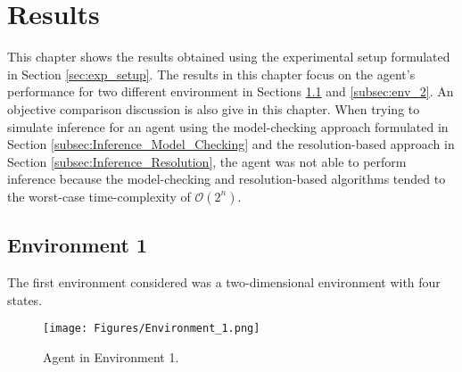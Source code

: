 





\chapter{Results} 
\label{chapter:Results}

This chapter shows the results obtained using the experimental setup formulated in Section \ref{sec:exp_setup}.
The results in this chapter focus on the agent's performance for two different environment in Sections \ref{subsec:env_1} and \ref{subsec:env_2}. An objective comparison discussion is also give in this chapter. When trying to simulate inference for an agent using the model-checking approach formulated in Section \ref{subsec:Inference_Model_Checking} and the resolution-based approach in Section \ref{subsec:Inference_Resolution}, the agent was not able to perform inference because the model-checking and resolution-based algorithms tended to the worst-case time-complexity of $\mathcal{O}(2^n)$.

\vspace{-0.4cm}

\section{Environment 1}
\label{subsec:env_1}

The first environment considered was a two-dimensional environment with four states.

\begin{figure}[H]
    \centering
    \texttt{[image: Figures/Environment\_1.png]}
    \caption{Agent in Environment 1.}
    \label{fig:env_1}
\end{figure}

